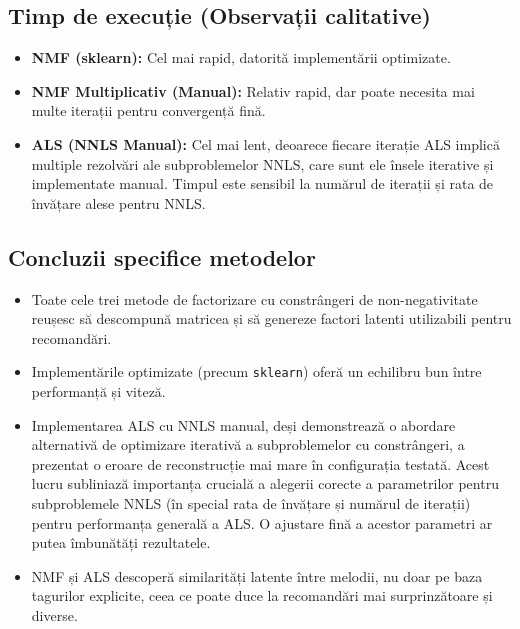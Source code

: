 \documentclass[12pt,a4paper]{article}
\begin{document}
\subsection{Timp de execuție (Observații calitative)}
\begin{itemize}
\item \textbf{NMF (sklearn):} Cel mai rapid, datorită implementării optimizate.
\item \textbf{NMF Multiplicativ (Manual):} Relativ rapid, dar poate necesita mai multe iterații pentru convergență fină.
\item \textbf{ALS (NNLS Manual):} Cel mai lent, deoarece fiecare iterație ALS implică multiple rezolvări ale subproblemelor NNLS, care sunt ele însele iterative și implementate manual. Timpul este sensibil la numărul de iterații și rata de învățare alese pentru NNLS.
\end{itemize}

\subsection{Concluzii specifice metodelor}
\begin{itemize}
\item Toate cele trei metode de factorizare cu constrângeri de non-negativitate reușesc să descompună matricea și să genereze factori latenti utilizabili pentru recomandări.
\item Implementările optimizate (precum \texttt{sklearn}) oferă un echilibru bun între performanță și viteză.
\item Implementarea ALS cu NNLS manual, deși demonstrează o abordare alternativă de optimizare iterativă a subproblemelor cu constrângeri, a prezentat o eroare de reconstrucție mai mare în configurația testată. Acest lucru subliniază importanța crucială a alegerii corecte a parametrilor pentru subproblemele NNLS (în special rata de învățare și numărul de iterații) pentru performanța generală a ALS. O ajustare fină a acestor parametri ar putea îmbunătăți rezultatele.
\item NMF și ALS descoperă similarități latente între melodii, nu doar pe baza tagurilor explicite, ceea ce poate duce la recomandări mai surprinzătoare și diverse.
\end{itemize}
\end{document}
